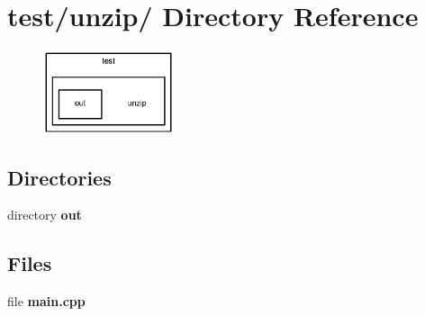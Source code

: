 \section{test/unzip/ Directory Reference}
\label{dir_0d290f915246044ba3a14f034cd1d91c}


\nopagebreak
\begin{figure}[H]
\begin{center}
\leavevmode
\includegraphics[width=109pt]{dir_0d290f915246044ba3a14f034cd1d91c_dep}
\end{center}
\end{figure}
\subsection*{Directories}
\begin{CompactItemize}
\item 
directory {\bf out}
\end{CompactItemize}
\subsection*{Files}
\begin{CompactItemize}
\item 
file \textbf{main.cpp}
\end{CompactItemize}
